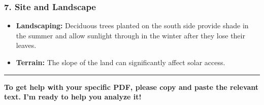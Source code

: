 \documentclass[
  10pt,
  letterpaper,
]{scrbook}
\providecommand{\tightlist}{%
  \setlength{\itemsep}{0pt}\setlength{\parskip}{0pt}}
\begin{document}
\subsubsection{7. Site and Landscape}\label{site-and-landscape}

\begin{itemize}
\tightlist
\item
  \textbf{Landscaping:} Deciduous trees planted on the south side
  provide shade in the summer and allow sunlight through in the winter
  after they lose their leaves.
\item
  \textbf{Terrain:} The slope of the land can significantly affect solar
  access.
\end{itemize}

\begin{center}\rule{0.5\linewidth}{0.5pt}\end{center}

\textbf{To get help with your specific PDF, please copy and paste the
relevant text. I'm ready to help you analyze it!}


\backmatter
\end{document}
